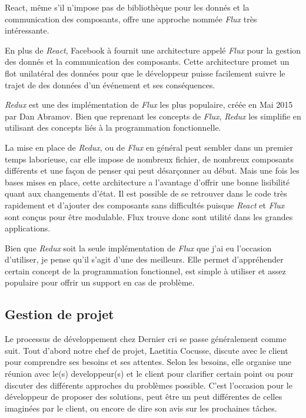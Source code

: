 React, même s'il n'impose pas de bibliothèque pour les donnés et la
communication des composants, offre une approche nommée \emph{Flux} très
intéressante.

\bigskip

En plus de \emph{React}, Facebook à fournit une architecture appelé
\emph{Flux} pour la gestion des donnés et la communication des
composants. Cette architecture promet un flot unilatéral des données
pour que le développeur puisse facilement suivre le trajet de des
données d'un événement et ses conséquences.

\bigskip

\emph{Redux} est une des implémentation de \emph{Flux} les plus
populaire, créée en Mai 2015 par Dan Abramov. Bien que reprenant les
concepts de \emph{Flux}, \emph{Redux} les simplifie en utilisant des
concepts liés à la programmation fonctionnelle.

\bigskip

La mise en place de \emph{Redux}, ou de \emph{Flux} en général peut
sembler dans un premier temps laborieuse, car elle impose de nombreux
fichier, de nombreux composants différents et une façon de penser qui
peut désarçonner au début. Mais une fois les bases mises en place, cette
architecture a l'avantage d'offrir une bonne lisibilité quant aux
changements d'état. Il est possible de se retrouver dans le code très
rapidement et d'ajouter des composants sans difficultés puisque
\emph{React} et \emph{Flux} sont conçus pour être modulable. Flux trouve
donc sont utilité dans les grandes applications.

\bigskip

Bien que \emph{Redux} soit la seule implémentation de \emph{Flux} que
j'ai eu l'occasion d'utiliser, je pense qu'il s'agit d'une des
meilleurs. Elle permet d'appréhender certain concept de la programmation
fonctionnel, est simple à utiliser et assez populaire pour offrir un
support en cas de problème.

\bigskip

\subsection{Gestion de projet}\label{gestion-de-projet}

\bigskip

Le processus de développement chez Dernier cri se passe généralement
comme suit. Tout d'abord notre chef de projet, Laetitia Cocusse, discute
avec le client pour comprendre ses besoins et ses attentes. Selon les
besoins, elle organise une réunion avec le(s) developpeur(s) et le
client pour clarifier certain point ou pour discuter des différents
approches du problèmes possible. C'est l'occasion pour le développeur de
proposer des solutions, peut être un peut différentes de celles
imaginées par le client, ou encore de dire son avis sur les prochaines
tâches.

